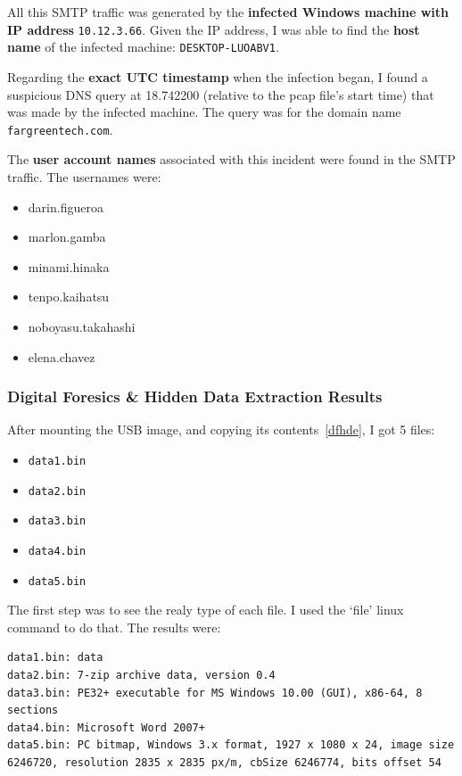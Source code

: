 \documentclass[pdflatex,sn-mathphys-num]{sn-jnl}
\begin{document}
\par All this SMTP traffic was generated by the \textbf{infected Windows machine with IP address} \texttt{10.12.3.66}.
Given the IP address, I was able to find the \textbf{host name} of the infected machine: \texttt{DESKTOP-LUOABV1}.

\par Regarding the \textbf{exact UTC timestamp} when the infection began, I found a suspicious DNS query at 18.742200
(relative to the pcap file's start time) that was made by the infected machine. The query was for the domain name 
\texttt{fargreentech.com}.

\par The \textbf{user account names} associated with this incident were found in the SMTP traffic. The usernames were:

\begin{itemize}
    \item darin.figueroa
    \item marlon.gamba
    \item minami.hinaka
    \item tenpo.kaihatsu
    \item noboyasu.takahashi
    \item elena.chavez
\end{itemize}

\subsubsection{Digital Foresics \& Hidden Data Extraction Results}

\par After mounting the USB image, and copying its contents~\ref{dfhde}, I got 5 files:

\begin{itemize}
    \item \texttt{data1.bin}
    \item \texttt{data2.bin}
    \item \texttt{data3.bin}
    \item \texttt{data4.bin}
    \item \texttt{data5.bin}
\end{itemize}

\par The first step was to see the realy type of each file. I used the `file' linux command to do that. The results were:

\begin{lstlisting}[style=fileresultstyle]
data1.bin: data
data2.bin: 7-zip archive data, version 0.4
data3.bin: PE32+ executable for MS Windows 10.00 (GUI), x86-64, 8 sections
data4.bin: Microsoft Word 2007+
data5.bin: PC bitmap, Windows 3.x format, 1927 x 1080 x 24, image size 6246720, resolution 2835 x 2835 px/m, cbSize 6246774, bits offset 54
\end{lstlisting}
\end{document}
